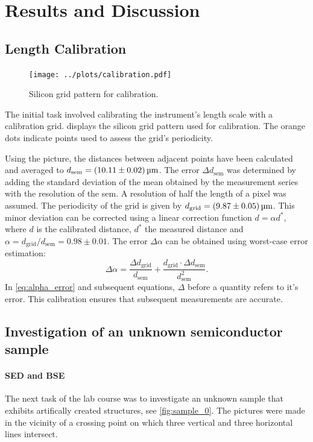 \section{Results and Discussion}
\subsection{Length Calibration}

\begin{figure}
	\centering
	\texttt{[image: ../plots/calibration.pdf]}
	\caption{Silicon grid pattern for calibration.}
	\label{fig:calibration}
\end{figure}

The initial task involved calibrating the instrument's length scale with a calibration grid.
 displays the silicon grid pattern
used for calibration.
The orange dots indicate points used to assess the grid's periodicity.

Using the picture, the distances between adjacent points have
been calculated and averaged to 
$d_{\mathrm{sem}}=\qty{10.11 \pm 0.02}{\micro\meter}$.
The error $\Delta d_{\mathrm{sem}}$ was determined by adding the standard 
deviation of the mean obtained by the measurement series with the resolution of the \ac{sem}. 
A resolution of half the length of a pixel was assumed.
The periodicity of the grid is given by
$d_{\mathrm{grid}}=\qty{9.87\pm 0.05}{\micro\meter}$.
This minor deviation can be corrected using a linear
correction function $d = \alpha d^*$, where $d$ is the calibrated
distance, $d^*$ the measured distance and
$\alpha=d_{\mathrm{grid}} /d_{\mathrm{sem}} = \num{0.98} \pm \num{0.01}$.
The error $\Delta \alpha$ can be obtained using worst-case error estimation:
\begin{equation}
	\Delta\alpha=\frac{\Delta d_{\mathrm{grid}}}{d_{\mathrm{sem}}}
	+\frac{d_{\mathrm{grid}}\cdot\Delta d_{\mathrm{sem}}}{d_{\mathrm{sem}}^{2}}.
	\label{eq:alpha_error}
\end{equation}
In \cref{eq:alpha_error} and subsequent equations, $\Delta$ before a quantity refers to 
it's error. 
This calibration ensures that subsequent measurements are accurate.

\subsection{Investigation of an unknown semiconductor sample}
\paragraph{SED and BSE}
The next task of the lab course was to investigate an unknown sample
that exhibits artifically created structures, see \cref{fig:sample_0}.
The pictures were made in the vicinity of a crossing
point on which three vertical and three horizontal lines intersect.

